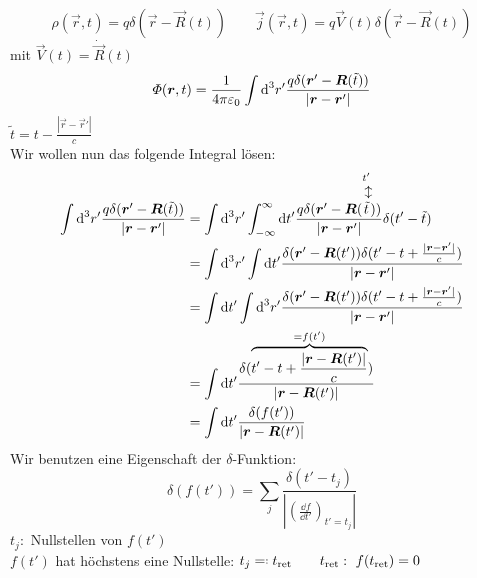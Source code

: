 %
%
%
%
%
%
\begin{equation*}
\rho(\vec{r},t) = q \delta (\vec{r} - \vec{R}(t)) \qquad \vec{j}(\vec{r},t) = q \vec{V}(t) \delta(\vec{r} - \vec{R}(t))
\end{equation*}
mit $ \vec{V}(t) = \dot{\vec{R}}(t) $\\
\begin{equation*}
\varPhi(\bm{r},t) = \frac{1}{4\pi\varepsilon_0} \int \textrm{d}^3 r' \frac{q \delta(\bm{r}' - \bm{R}(\tilde{t}))}{|\bm{r} - \bm{r}'|}
\end{equation*}
$ \tilde{t} = t - \frac{|\vec{r} - \vec{r}'|}{c} $\\
Wir wollen nun das folgende Integral lösen:
\begin{align*}
\int \dd^3 r' \frac{q \delta(\vec{r}' - \vec{R}(\tilde{t}))}{|\vec{r} - \vec{r}'|} &= \int \dd^3 r' \int_{-\infty}^{\infty} \dd t' \frac{q \delta(\vec{r}' - \vec{R}(\custoup{\leftrightarrow}{\tilde{t}}{t'}))}{|\vec{r} - \vec{r}'|} \delta(t' - \tilde{t})\\
&= \int \dd^3 r' \int \dd t' \frac{\delta(\vec{r}' - \vec{R}(t')) \delta(t' - t + \frac{|\vec{r} - \vec{r}'|}{c})}{|\vec{r} - \vec{r}'|}\\
&= \int \dd t' \int \dd^3 r' \frac{\delta(\vec{r}' - \vec{R}(t')) \delta(t' - t + \frac{|\vec{r} - \vec{r}'|}{c})}{|\vec{r} - \vec{r}'|}\\
&= \int \dd t' \frac{\delta(\ob{t' - t + \frac{|\vec{r} - \vec{R}(t')|}{c}}^{= f(t')})}{|\vec{r} - \vec{R}(t')|}\\
&= \int \dd t' \frac{\delta(f(t'))}{|\vec{r} - \vec{R}(t')|}
\end{align*}
Wir benutzen eine Eigenschaft der $ \delta $-Funktion:
\begin{equation*}
\delta (f(t')) = \sum_{j} \frac{\delta(t' - t_j)}{\left|\left(\frac{\dd f}{\dd t'}\right)_{t' = t_j}\right|}
\end{equation*}
$ t_j : $ Nullstellen von $ f(t') $\\
$ f(t') $ hat höchstens eine Nullstelle: $ t_j \eqdef t_{\tx{ret}} \qquad t_{\tx{ret}}: \ f(t_{\tx{ret}}) = 0$
